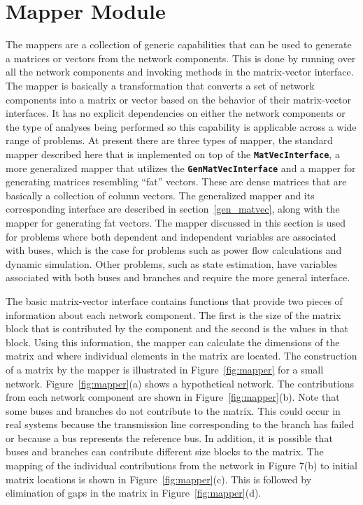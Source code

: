 \section{Mapper Module}\label{mapper}

The mappers are a collection of generic capabilities that can be used to
generate a matrices or vectors from the network components. This is done by
running over all the network components and invoking methods in the
matrix-vector interface. The mapper is basically a transformation that converts
a set of network components into a matrix or vector based on the behavior of
their matrix-vector interfaces. It has no explicit dependencies on either the
network components or the type of analyses being performed so this capability is
applicable across a wide range of problems. At present there are three types of
mapper, the standard mapper described here that is implemented on top of the
\texttt{\textbf{MatVecInterface}}, a more generalized mapper that utilizes the
\texttt{\textbf{GenMatVecInterface}} and a mapper for generating matrices
resembling ``fat'' vectors. These are dense matrices that are basically a
collection of column vectors. The generalized mapper and its corresponding
interface are described in section~\ref{gen_matvec}, along with the mapper for generating fat vectors. The mapper discussed in this section is used for problems where both dependent and independent variables are associated with buses, which is the case for problems such as power flow calculations and dynamic simulation. Other problems, such as state estimation, have variables associated with both buses and branches and require the more general interface.

The basic matrix-vector interface contains functions that provide two pieces of
information about each network component. The first is the size of the matrix
block that is contributed by the component and the second is the values in that
block. Using this information, the mapper can calculate the dimensions of the
matrix and where individual elements in the matrix are located. The construction
of a matrix by the mapper is illustrated in  Figure~\ref{fig:mapper} for a small
network. Figure~\ref{fig:mapper}(a) shows a hypothetical network. The
contributions from each network component are shown in
Figure~\ref{fig:mapper}(b). Note that some buses and branches do not contribute
to the matrix. This could occur in real systems because the transmission line
corresponding to the branch has failed or because a bus represents the reference
bus. In addition, it is possible that buses and branches can contribute
different size blocks to the matrix. The mapping of the individual contributions
from the network in Figure 7(b) to initial matrix locations is shown in
Figure~\ref{fig:mapper}(c). This is followed by elimination of gaps in the
matrix in Figure~\ref{fig:mapper}(d).

